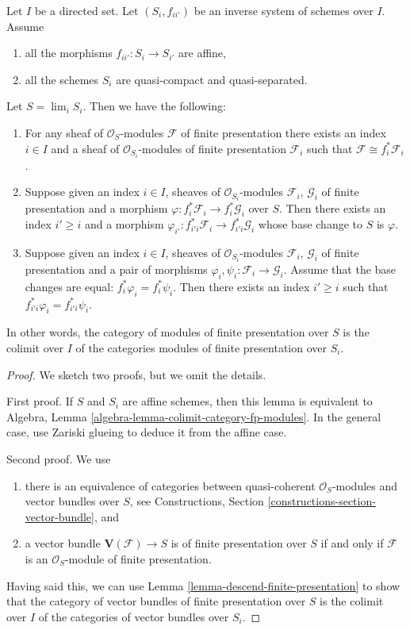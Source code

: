 \begin{lemma}
\label{lemma-descend-modules-finite-presentation}
Let $I$ be a directed set.
Let $(S_i, f_{ii'})$ be an inverse system of schemes over $I$.
Assume
\begin{enumerate}
\item all the morphisms $f_{ii'} : S_i \to S_{i'}$ are affine,
\item all the schemes $S_i$ are quasi-compact and quasi-separated.
\end{enumerate}
Let $S = \lim_i S_i$. Then we have the following:
\begin{enumerate}
\item For any sheaf of $\mathcal{O}_S$-modules
$\mathcal{F}$ of finite presentation there exists an index
$i \in I$ and a sheaf of $\mathcal{O}_{S_i}$-modules of finite
presentation $\mathcal{F}_i$ such that
$\mathcal{F} \cong f_i^*\mathcal{F}_i$.
\item Suppose given an index $i \in I$, sheaves
of $\mathcal{O}_{S_i}$-modules $\mathcal{F}_i$, $\mathcal{G}_i$
of finite presentation and a morphism
$\varphi : f_i^*\mathcal{F}_i \to f_i^*\mathcal{G}_i$ over $S$.
Then there exists an index $i' \geq i$ and a morphism
$\varphi_{i'} : f_{i'i}^*\mathcal{F}_i \to f_{i'i}^*\mathcal{G}_i$
whose base change to $S$ is $\varphi$.
\item Suppose given an index $i \in I$, sheaves of $\mathcal{O}_{S_i}$-modules
$\mathcal{F}_i$, $\mathcal{G}_i$ of finite presentation
and a pair of morphisms $\varphi_i, \psi_i : \mathcal{F}_i \to \mathcal{G}_i$.
Assume that the base changes are equal: $f_i^*\varphi_i = f_i^*\psi_i$.
Then there exists an index $i' \geq i$ such that
$f_{i'i}^*\varphi_i = f_{i'i}^*\psi_i$.
\end{enumerate}
In other words, the category of modules
of finite presentation over $S$ is the colimit over $I$
of the categories modules of finite presentation over $S_i$.
\end{lemma}

\begin{proof}
We sketch two proofs, but we omit the details.

\medskip\noindent
First proof. If $S$ and $S_i$ are affine schemes, then this lemma
is equivalent to
Algebra, Lemma \ref{algebra-lemma-colimit-category-fp-modules}.
In the general case, use Zariski glueing to deduce it from the affine case.

\medskip\noindent
Second proof. We use
\begin{enumerate}
\item there is an equivalence of categories between quasi-coherent
$\mathcal{O}_S$-modules and vector bundles over $S$, see
Constructions, Section \ref{constructions-section-vector-bundle}, and
\item a vector bundle $\mathbf{V}(\mathcal{F}) \to S$ is
of finite presentation over $S$ if and only if $\mathcal{F}$
is an $\mathcal{O}_S$-module of finite presentation.
\end{enumerate}
Having said this, we can use Lemma \ref{lemma-descend-finite-presentation}
to show that the category of vector bundles of finite
presentation over $S$ is the colimit over $I$
of the categories of vector bundles over $S_i$.
\end{proof}

